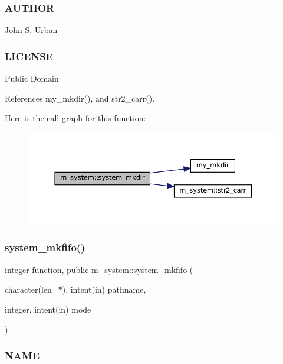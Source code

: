 \subsubsection*{A\+U\+T\+H\+OR}

John S. Urban \subsubsection*{L\+I\+C\+E\+N\+SE}

Public Domain 

References my\+\_\+mkdir(), and str2\+\_\+carr().

Here is the call graph for this function\+:\nopagebreak
\begin{figure}[H]
\begin{center}
\leavevmode
\includegraphics[width=350pt]{namespacem__system_a084d644c236d22af2cc75c6e48fd6e96_cgraph}
\end{center}
\end{figure}
\mbox{\label{namespacem__system_ab2d95258ee26b85a0283538880775475}} 
\subsubsection{\texorpdfstring{system\+\_\+mkfifo()}{system\_mkfifo()}}
{\footnotesize\ttfamily integer function, public m\+\_\+system\+::system\+\_\+mkfifo (\begin{DoxyParamCaption}\item[{character(len=$\ast$), intent(in)}]{pathname,  }\item[{integer, intent(in)}]{mode }\end{DoxyParamCaption})}



\subsubsection*{N\+A\+ME}

